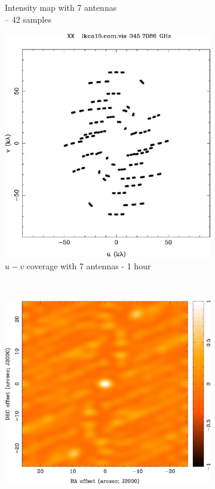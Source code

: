 \begin{figure}
\begin{subfigure}[b]{0.5\textwidth}
                \caption{Intensity map with 7 antennas\\ -- 42 samples}
                \label{fig:lm7ant}
        \end{subfigure} %
          \begin{subfigure}[b]{0.5\textwidth}
                \includegraphics[scale=0.4]{Figures/uv-coverage/7antcov1h}
                \caption{$u-v$ coverage with 7 antennas - 1 hour}
                \label{fig:uv7ant1h}
        \end{subfigure}%
        ~ %
        \begin{subfigure}[b]{0.5\textwidth}
                \includegraphics[scale=0.4]{Figures/uv-coverage/7antIma1h}

\end{subfigure}
\end{figure}
